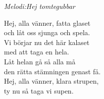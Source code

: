 {\footnotesize\textit{Melodi:Hej tomtegubbar}}\par
\vspace{10pt}
Hej, alla vänner, fatta glaset\\
och låt oss sjunga och spela.\\
Vi börjar nu det här kalaset\\
med att taga en hela.\\
Låt helan gå så alla må\\
den rätta stämningen genast få.\\
Hej, alla vänner, klara strupen,\\
ty nu så taga vi supen.